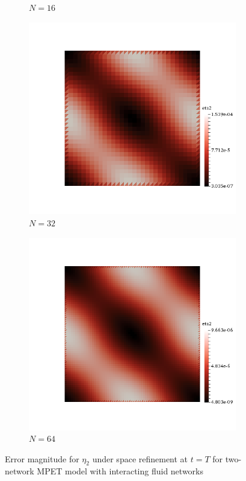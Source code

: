 \begin{figure}[h!]
\begin{subfigure}[b]{0.24\textwidth}
    \caption{$N=16$}
  \end{subfigure}
  \begin{subfigure}[b]{0.24\textwidth}
    \includegraphics[width=\textwidth,height=\textheight,keepaspectratio,height=\textheight,keepaspectratio]{figures/2_mpet/no_transfer/space/eta2_32.png}
    \caption{$N=32$}
  \end{subfigure}
  \begin{subfigure}[b]{0.24\textwidth}
    \includegraphics[width=\textwidth,height=\textheight,keepaspectratio,height=\textheight,keepaspectratio]{figures/2_mpet/no_transfer/space/eta2_64.png}
    \caption{$N=64$}
  \end{subfigure}
  \caption{Error magnitude for $\eta_2$ under space refinement at $t=T$ for two-network MPET model with interacting fluid networks} \label{fig:bb_default_eta2}
\end{figure}
